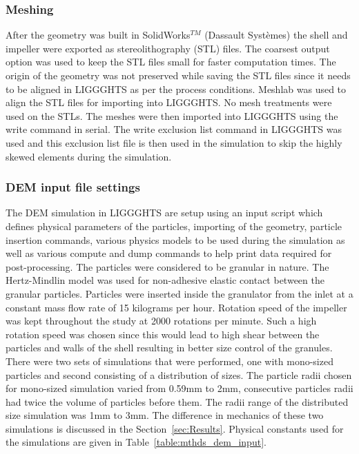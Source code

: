 \documentclass[preprint,11pt,authoryear]{elsarticle}
\begin{document}
\subsubsection{Meshing}
 After the geometry was built in SolidWorks$^{TM}$ (Dassault Syst\`{e}mes) the shell and impeller 
were exported as stereolithography (STL) files. The coarsest output option was used to keep the STL files 
small for faster computation times. The origin of the geometry was not preserved while saving 
the STL files since it needs to be aligned in LIGGGHTS as per the process conditions. 
Meshlab was used to align the STL files for importing into LIGGGHTS. No mesh treatments were 
used on the STLs. The meshes were then imported into LIGGGHTS using the write command in serial. 
The write exclusion list command in LIGGGHTS was used and this exclusion list file is then used in the 
simulation to skip the highly skewed elements during the simulation. 


\subsubsection{DEM input file settings}
The DEM simulation in LIGGGHTS are setup using an input script which defines physical 
parameters of the particles, importing of the geometry, particle insertion commands, various physics 
models to be used during the simulation as well as various compute and dump commands to help print 
data required for post-processing. The particles were considered to be granular in 
nature. The Hertz-Mindlin model was used for non-adhesive elastic contact between the granular particles. 
Particles were inserted inside the granulator from the inlet at a constant mass flow rate of 15 
kilograms per hour. Rotation speed of the impeller was kept throughout the study at 2000 rotations 
per minute. Such a high rotation speed was chosen since this would lead to high shear between the 
particles and walls of the shell resulting in better size control of the granules. There were two sets of 
simulations that were performed, one with mono-sized particles and second consisting of a distribution 
of sizes. The particle radii chosen for mono-sized simulation varied from 0.59mm to 2mm, consecutive 
particles radii had twice the volume of particles before them. The radii range of the distributed 
size simulation was 1mm to 3mm. The difference in mechanics of these two simulations is discussed 
in the Section~\ref{sec:Results}. Physical constants used for the simulations are given in 
Table~\ref{table:mthds_dem_input}.
\end{document}
